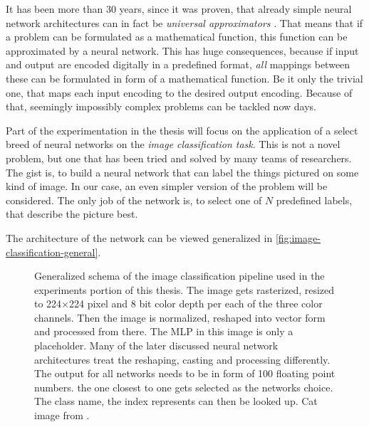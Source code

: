 It has been more than 30 years, since it was proven, that already simple neural network architectures can in fact be \emph{universal approximators} \cite*{ffnUnversalApproximator}. 
That means that if a problem can be formulated as a mathematical function, this function can be approximated by a neural network.
This has huge consequences, because if input and output are encoded digitally in a predefined format, \emph{all} mappings between these can be formulated in form of a mathematical function. 
Be it only the trivial one, that maps each input encoding to the desired output encoding.
Because of that, seemingly impossibly complex problems can be tackled now days. 

Part of the experimentation in the thesis will focus on the application of a select breed of neural networks on the \emph{image classification task}.
This is not a novel problem, but one that has been tried and solved by many teams of researchers. 
The gist is, to build a neural network that can label the things pictured on some kind of image.
In our case, an even simpler version of the problem will be considered. 
The only job of the network is, to select one of $N$ predefined labels, that describe the picture best.

The architecture of the network can be viewed generalized in \autoref{fig:image-classification-general}.

\begin{figure}[htbp]
    \centering
    \caption{Generalized schema of the image classification pipeline used in the experiments portion of this thesis.
        The image gets rasterized, resized to 224$\times$224 pixel and 8 bit color depth per each of the three color channels. Then the image is normalized, reshaped into vector form and processed from there. The MLP in this image is only a placeholder. Many of the later discussed neural network architectures treat the reshaping, casting and processing differently. The output for all networks needs to be in form of 100 floating point numbers. the one closest to one gets selected as the networks choice. The class name, the index represents can then be looked up.
        Cat image from \cite{catPhoto}.
    }
    \label{fig:image-classification-general}
\end{figure}

